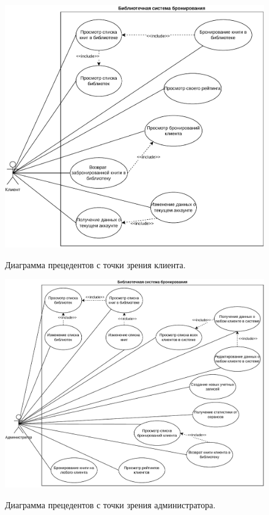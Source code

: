 \documentclass[a4paper, 12pt]{article}
\begin{document}
\begin{large}
\begin{figure}[h]
	\begin{center}
		{\includegraphics[scale = 0.6]{UseCaseClient}}
		\caption{Диаграмма прецедентов с точки зрения клиента.}
		\label{fig:use-case-client}
	\end{center}
\end{figure}

\begin{figure}[h!]
	\begin{center}
		{\includegraphics[scale = 0.6]{UseCaseAdmin}}
		\caption{Диаграмма прецедентов с точки зрения администратора.}
		\label{fig:use-case-admin}
	\end{center}
\end{figure}


\end{large}
\end{document}
